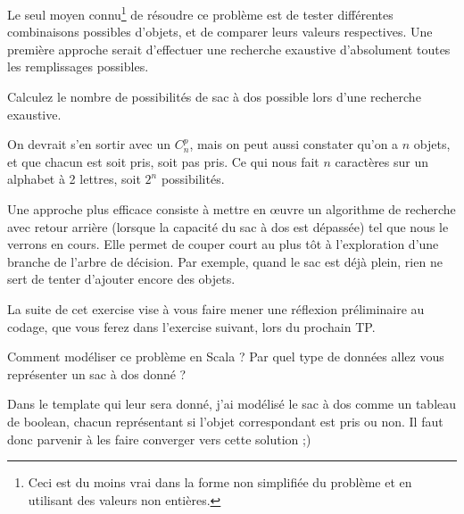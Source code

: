 \documentclass[10pt]{article}\usepackage[nu]{esial}
\begin{document}
\medskip Le seul moyen connu\footnote{Ceci est du moins vrai dans la forme non
  simplifiée du problème et en utilisant des valeurs non entières.
  } de résoudre ce problème est de tester différentes combinaisons
possibles d'objets, et de comparer leurs valeurs respectives.  Une première
approche serait d'effectuer une recherche exaustive d'absolument toutes les
remplissages possibles.

\Question Calculez le nombre de possibilités de sac à dos possible lors d'une
recherche exaustive.

\begin{Reponse}
  On devrait s'en sortir avec un $C_n^p$, mais on peut aussi constater qu'on a
  $n$ objets, et que chacun est soit pris, soit pas pris. Ce qui nous fait $n$
  caractères sur un alphabet à 2 lettres, soit $2^n$ possibilités.
\end{Reponse}

\medskip Une approche plus efficace consiste à mettre en œuvre un algorithme de
recherche avec retour arrière (lorsque la capacité du sac à dos est dépassée)
tel que nous le verrons en cours. Elle permet de couper court au plus tôt à
l'exploration d'une branche de l'arbre de décision. Par exemple, quand le sac
est déjà plein, rien ne sert de tenter d'ajouter encore des objets.

La suite de cet exercise vise à vous faire mener une réflexion préliminaire au
codage, que vous ferez dans l'exercise suivant, lors du prochain TP.

\Question Comment modéliser ce problème en Scala ? Par quel type de données allez
vous représenter un sac à dos donné ? 

\begin{Reponse}
  Dans le template qui leur sera donné, j'ai modélisé le sac à dos comme un
  tableau de boolean, chacun représentant si l'objet correspondant est pris ou
  non. Il faut donc parvenir à les faire converger vers cette solution ;) 
\end{Reponse}


\end{document}
